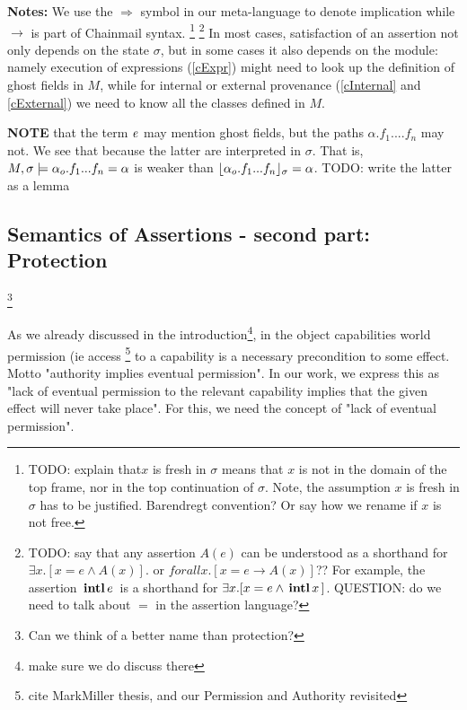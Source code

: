 \textbf{Notes:}  We use the $\Longrightarrow$ symbol in our meta-language to denote implication while $\rightarrow$ is part of Chainmail syntax.
\footnote{{TODO: explain that$x$ is fresh in $\sigma$  means that $x$ is not in the domain of the top frame, nor in the top continuation of $\sigma$.
 Note, the assumption $x$ is fresh in $\sigma$ has to be justified. Barendregt convention? Or say how we rename if $x$ is not free.}}
\footnote{{TODO: say that any assertion $A(e)$ can be understood as a shorthand for $\exists x. [ x=e \wedge A(x)]$. or  $forall x. [ x=e \rightarrow A(x)]$?? For example, the  assertion   ${{\, \mathbf{intl}\, e\, }}$ is a shorthand for $\exists x. [ x=e \wedge {{\ensuremath{\, \mathbf{intl}}\, x\, }}]$. QUESTION: do we need to talk about $=$ in the assertion language?}}
In most cases, satisfaction of an assertion not only depends on the state $\sigma$, but 
in some cases it also depends on the module: namely execution of expressions (\ref{cExpr}) might need to look up the definition of ghost fields  in $M$, while 
for internal or external provenance (\ref{cInternal} and \ref{cExternal}) we need to know all the classes defined in $M$.

{\textbf{NOTE}  that the term $\mathit{e}$ may mention ghost fields, but the paths $\alpha.f_1....f_n$ may not. We see that because the latter are interpreted in $\sigma$. That is, $M , \sigma \models {\alpha_o.f_1...f_n}=\alpha$ is weaker than $\lfloor \alpha_{o}.f_1...f_n \rfloor_{\sigma}=\alpha$. TODO: write the latter as a lemma}


\subsection{Semantics of Assertions - second part:
  Protection}\footnote{Can we think of a better name than protection? }

As we already discussed in the introduction\footnote{make sure we do discuss there}, in the object capabilities world permission (ie access  \footnote{cite MarkMiller thesis, and our Permission and Authority revisited} to a capability is a necessary precondition to some effect. Motto "authority implies eventual permission".
In our work, we express this as "lack of eventual permission to the relevant capability implies that the given effect will never take place".
For this, we need the concept of "lack of  eventual permission".  



